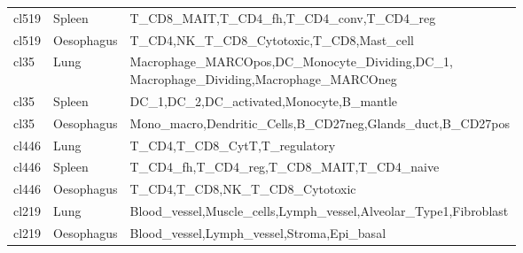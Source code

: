 \begin{table}[pht!]
\begin{tabular}{lll}
  cl519 & Spleen & T\_CD8\_MAIT,T\_CD4\_fh,T\_CD4\_conv,T\_CD4\_reg \\ 
  cl519 & Oesophagus & T\_CD4,NK\_T\_CD8\_Cytotoxic,T\_CD8,Mast\_cell \\ 
  cl35 & Lung & \specialcell[t]{Macrophage\_MARCOpos,DC\_Monocyte\_Dividing,DC\_1,\\Macrophage\_Dividing,Macrophage\_MARCOneg} \\ 
  cl35 & Spleen & DC\_1,DC\_2,DC\_activated,Monocyte,B\_mantle \\ 
  cl35 & Oesophagus & Mono\_macro,Dendritic\_Cells,B\_CD27neg,Glands\_duct,B\_CD27pos \\ 
  cl446 & Lung & T\_CD4,T\_CD8\_CytT,T\_regulatory \\ 
  cl446 & Spleen & T\_CD4\_fh,T\_CD4\_reg,T\_CD8\_MAIT,T\_CD4\_naive \\ 
  cl446 & Oesophagus & T\_CD4,T\_CD8,NK\_T\_CD8\_Cytotoxic \\ 
  cl219 & Lung & Blood\_vessel,Muscle\_cells,Lymph\_vessel,Alveolar\_Type1,Fibroblast \\ 
  cl219 & Oesophagus & Blood\_vessel,Lymph\_vessel,Stroma,Epi\_basal \\ 
     \bottomrule
\end{tabular}
\end{table}  
  
